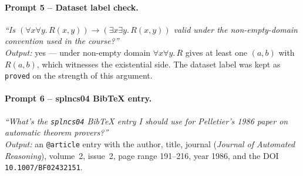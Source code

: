 \paragraph{Prompt 5 -- Dataset label check.}
\textit{``Is $(\forall x\forall y.\,R(x,y)) \to (\exists x\exists
y.\,R(x,y))$ valid under the non-empty-domain convention used in the
course?''}
\\\textit{Output:} yes — under non-empty domain $\forall x\forall y.\,R$
gives at least one $(a,b)$ with $R(a,b)$, which witnesses the
existential side. The dataset label was kept as \texttt{proved} on the
strength of this argument.

\paragraph{Prompt 6 -- splncs04 BibTeX entry.}
\textit{``What's the \texttt{splncs04} BibTeX entry I should use for
Pelletier's 1986 paper on automatic theorem provers?''}
\\\textit{Output:} an \texttt{@article} entry with the author, title,
journal (\textit{Journal of Automated Reasoning}), volume~2, issue~2,
page range 191--216, year 1986, and the DOI
\texttt{10.1007/BF02432151}.
